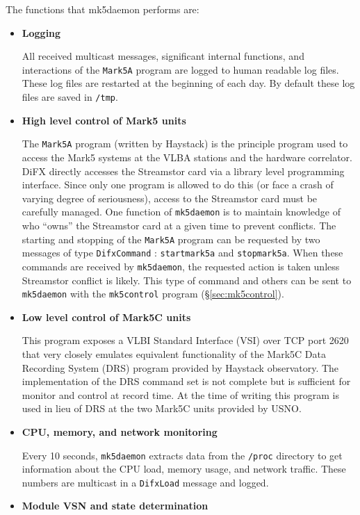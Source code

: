 The functions that mk5daemon performs are:
\begin{itemize}
\item {\bf Logging}

All received multicast messages, significant internal functions, and interactions of the {\tt Mark5A} program are logged to human readable log files.
These log files are restarted at the beginning of each day.  
By default these log files are saved in {\tt /tmp}.

\item {\bf High level control of Mark5 units}

The {\tt Mark5A} program (written by Haystack) is the principle program used to access the Mark5 systems at the VLBA stations and the hardware correlator.
DiFX directly accesses the Streamstor card via a library level programming interface.
Since only one program is allowed to do this (or face a crash of varying degree of seriousness), access to the Streamstor
card must be carefully managed.
One function of {\tt mk5daemon} is to maintain knowledge of who ``owns'' the Streamstor card at a given time to prevent conflicts.
The starting and stopping of the {\tt Mark5A} program can be requested by two messages of type {\tt DifxCommand} : {\tt startmark5a} and {\tt stopmark5a}.
When these commands are received by {\tt mk5daemon}, the requested action is taken unless Streamstor conflict is likely.
This type of command and others can be sent to {\tt mk5daemon} with the {\tt mk5control} program (\S\ref{sec:mk5control}).

\item {\bf Low level control of Mark5C units}

This program exposes a VLBI Standard Interface (VSI) over TCP port 2620 that very closely emulates equivalent functionality of the Mark5C Data Recording System (DRS) program provided by Haystack observatory.
The implementation of the DRS command set is not complete but is sufficient for monitor and control at
record time.
At the time of writing this program is used in lieu of DRS at the two Mark5C units provided by USNO.

\item {\bf CPU, memory, and network monitoring}

Every 10 seconds, {\tt mk5daemon} extracts data from the {\tt /proc} directory to get information about the CPU load, memory usage, and network traffic.
These numbers are multicast in a {\tt DifxLoad} message and logged.

\item {\bf Module VSN and state determination}


\end{itemize}
